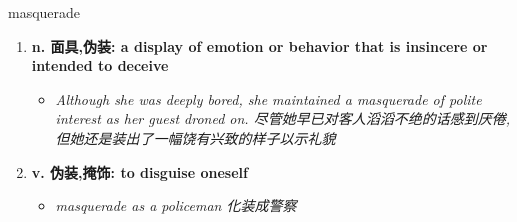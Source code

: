 
\begin{frame}
{\huge masquerade}
\begin{center}
\begin{enumerate}\Large
  \item \textbf{n. 面具,伪装: a display of emotion or behavior that is insincere or intended to deceive}
  \begin{itemize}
    \item \em{\Large{Although she was deeply bored, she maintained a masquerade of polite interest as her guest droned on. 尽管她早已对客人滔滔不绝的话感到厌倦,但她还是装出了一幅饶有兴致的样子以示礼貌}}
  \end{itemize}
  \item \textbf{v. 伪装,掩饰: to disguise oneself}
  \begin{itemize}
    \item \em{\Large{masquerade as a policeman 化装成警察}}
  \end{itemize}
\end{enumerate}
\end{center}
\end{frame}
